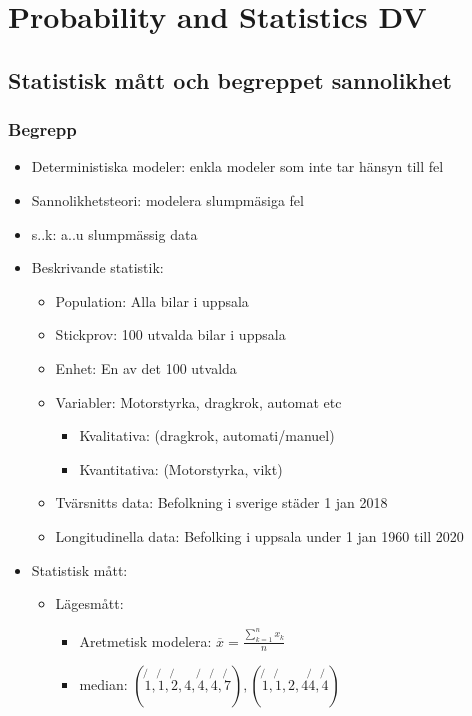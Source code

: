 \chapter{Probability and Statistics DV}

\newpage

\section{Statistisk mått och begreppet sannolikhet}
\subsection{Begrepp}
\begin{itemize}
    \item Deterministiska modeler: enkla modeler som inte tar hänsyn till fel
    \item Sannolikhetsteori: modelera slumpmäsiga fel
    \item s..k: a..u slumpmässig data
    \item Beskrivande statistik:
    \begin{itemize}
        \item Population: Alla bilar i uppsala
        \item Stickprov: 100 utvalda bilar i uppsala
        \item Enhet: En av det 100 utvalda
        \item Variabler: Motorstyrka, dragkrok, automat etc
        \begin{itemize}
          \item Kvalitativa: (dragkrok, automati/manuel)
          \item Kvantitativa: (Motorstyrka, vikt)
        \end{itemize}
        \item Tvärsnitts data: Befolkning i sverige städer 1 jan 2018
        \item Longitudinella data: Befolking i uppsala under 1 jan 1960 till 2020
    \end{itemize}
    \item Statistisk mått:
    \begin{itemize}
        \item Lägesmått:
        \begin{itemize}
          \item Aretmetisk modelera: $ \overline{x} = \frac{\sum_{k=1}^{n} x_k}{n} $
          \item median: $(\not{1}, \not{1}, \not{2}, 4, \not{4}, \not{4}, \not{7}), (\not{1}, \not{1}, 2, 4 \not{4}, \not{4})$

\end{itemize}
\end{itemize}
\end{itemize}
